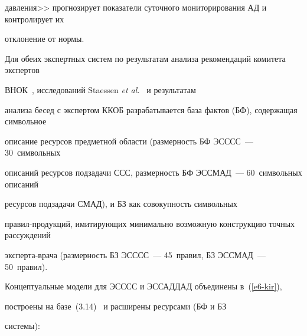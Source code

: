 давления>> прогнозирует показатели суточного мониторирования АД и контролирует их


отклонение от нормы.





 Для обеих экспертных систем по результатам анализа рекомендаций комитета экспертов


 ВНОК~\cite{11-kir}, исследований Staessen \textit{et al.}~\cite{12-kir} и результатам


анализа бесед с экспертом ККОБ разрабатывается база фактов (БФ), содержащая символьное


описание ресурсов предметной области (размерность БФ \mbox{ЭСССС}~--- 30~символьных


описаний ресурсов подзадачи ССС, размерность БФ \mbox{ЭССМАД}~--- 60~символьных описаний


ресурсов подзадачи СМАД), и БЗ как совокупность символьных


пра\-вил-про\-дук\-ций, имитирующих минимально возможную конструкцию точных рассуждений


 экс\-пер\-та-вра\-ча (размерность БЗ ЭСССС~--- 45~правил, БЗ ЭССМАД~--- 50~правил).





 Концептуальные модели для ЭСССС и ЭССАДДАД объединены в~(\ref{e6-kir}),


построены на базе~(3.14)~\cite{2-kir} и расширены ресурсами (БФ и БЗ


сис\-те\-мы):


